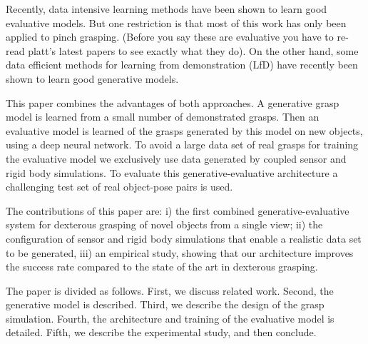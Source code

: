 Recently, data intensive learning methods have been shown to learn good evaluative models. %
But one restriction is that most of this work has only been applied to pinch grasping. (Before you say these are evaluative you have to re-read platt's latest papers to see exactly what they do). On the other hand, some data efficient methods for learning from demonstration (LfD) have recently been shown to learn good generative models.  

This paper combines the advantages of both approaches. A generative grasp model is learned from a small number of demonstrated grasps. Then an evaluative model is learned of the grasps generated by this model on new objects, using a deep neural network. To avoid a large data set of real grasps for training the evaluative model we exclusively use data generated by coupled sensor and rigid body simulations.
To evaluate this generative-evaluative architecture a challenging test set of real object-pose pairs is used. 

The contributions of this paper are: i) the first combined generative-evaluative system for dexterous grasping of novel objects from a single view; ii) the configuration of sensor and rigid body simulations that enable a realistic data set to be generated, iii) an empirical study, showing that our architecture improves the success rate compared to the state of the art in dexterous grasping.

The paper is divided as follows. First, we discuss related work. Second, the  generative model is described. Third, we describe the design of the grasp simulation. Fourth, the architecture and training of the evaluative model is detailed. Fifth, we describe the experimental study, and then conclude.

